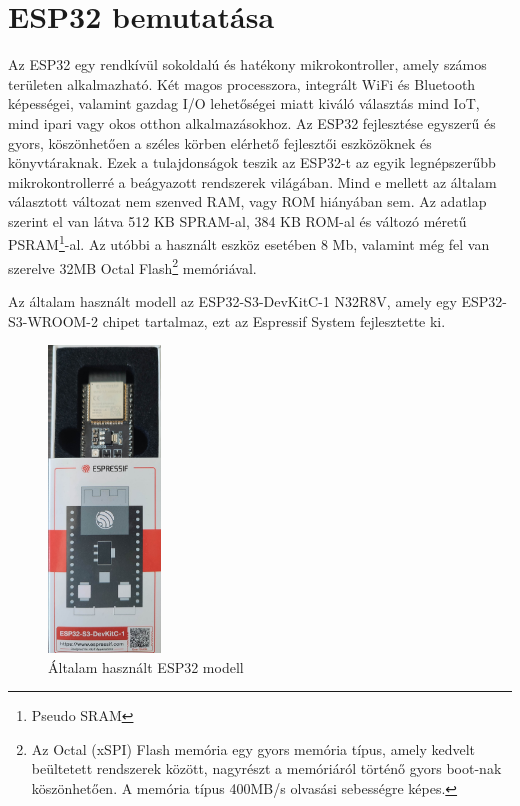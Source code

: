 \documentclass{thesis-ekf}
\theoremstyle{definition}
\theoremstyle{remark}
\begin{document}
	\section{ESP32 bemutatása}
	\label{se_espB}
	Az ESP32 egy rendkívül sokoldalú és hatékony mikrokontroller, amely számos területen alkalmazható. Két magos processzora, integrált WiFi és Bluetooth képességei, valamint gazdag I/O lehetőségei miatt kiváló választás mind IoT, mind ipari vagy okos otthon alkalmazásokhoz. Az ESP32 fejlesztése egyszerű és gyors, köszönhetően a széles körben elérhető fejlesztői eszközöknek és könyvtáraknak. Ezek a tulajdonságok teszik az ESP32-t az egyik legnépszerűbb mikrokontrollerré a beágyazott rendszerek világában. Mind e mellett az általam választott változat nem szenved RAM, vagy ROM hiányában sem. Az adatlap szerint el van látva 512 KB SPRAM-al, 384 KB ROM-al és változó méretű PSRAM\footnote{Pseudo SRAM}-al. Az utóbbi a használt eszköz esetében 8 Mb, valamint még fel van szerelve 32MB Octal Flash\footnote{Az Octal (xSPI) Flash memória egy gyors memória típus, amely kedvelt beültetett rendszerek között, nagyrészt a memóriáról történő gyors boot-nak köszönhetően. A memória típus 400MB/s olvasási sebességre képes.\cite{bib_esp_octal}} memóriával.
	
	
	Az általam  használt modell az ESP32-S3-DevKitC-1 N32R8V, amely egy ESP32-S3-WROOM-2 chipet tartalmaz, ezt az Espressif System fejlesztette ki.
	\begin{figure}[!ht]
		\centering
		\includegraphics[width=3cm]{MyESP32}
		\caption{Általam használt ESP32 modell}
		\label{img_myesp}
	\end{figure}
	
\end{document}
